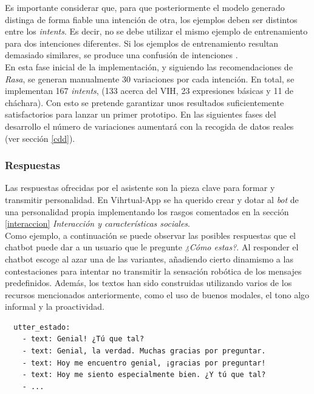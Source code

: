 Es importante considerar que, para que posteriormente el modelo generado distinga de forma fiable una intención de otra, los ejemplos deben ser distintos entre los \textit{intents}. Es decir, no se debe utilizar el mismo ejemplo de entrenamiento para dos intenciones diferentes. Si los ejemplos de entrenamiento resultan demasiado similares, se produce una confusión de intenciones \cite{bestPracticesNLU}.\\ 

En esta fase inicial de la implementación, y siguiendo las recomendaciones de \textit{Rasa}, se generan manualmente 30 variaciones por cada intención. En total, se implementan 167 \textit{intents}, (133 acerca del VIH, 23 expresiones básicas y 11 de cháchara). Con esto se pretende garantizar unos resultados suficientemente satisfactorios para lanzar un primer prototipo. En las siguientes fases del desarrollo el número de variaciones aumentará con la recogida de datos reales (ver sección \ref{cdd}).\\

\subsubsection{Respuestas}
Las respuestas ofrecidas por el asistente son la pieza clave para formar y transmitir personalidad. En Vihrtual-App se ha querido crear y dotar al \textit{bot} de una personalidad propia implementando los rasgos comentados en la sección \ref{interaccion} \textit{Interacción y características sociales}.\\

Como ejemplo, a continuación se puede observar las posibles respuestas que el chatbot puede dar a un usuario que le pregunte \textit{¿Cómo estas?}. Al responder el chatbot escoge al azar una de las variantes, añadiendo cierto dinamismo a las contestaciones para intentar no transmitir la sensación robótica de los mensajes predefinidos. Además, los textos han sido construidas utilizando varios de los recursos mencionados anteriormente, como el uso de buenos modales, el tono algo informal y la proactividad. \\

\begin{verbatim}
  utter_estado:
    - text: Genial! ¿Tú que tal?
    - text: Genial, la verdad. Muchas gracias por preguntar.
    - text: Hoy me encuentro genial, ¡gracias por preguntar!
    - text: Hoy me siento especialmente bien. ¿Y tú que tal?
    - ...
\end{verbatim}

